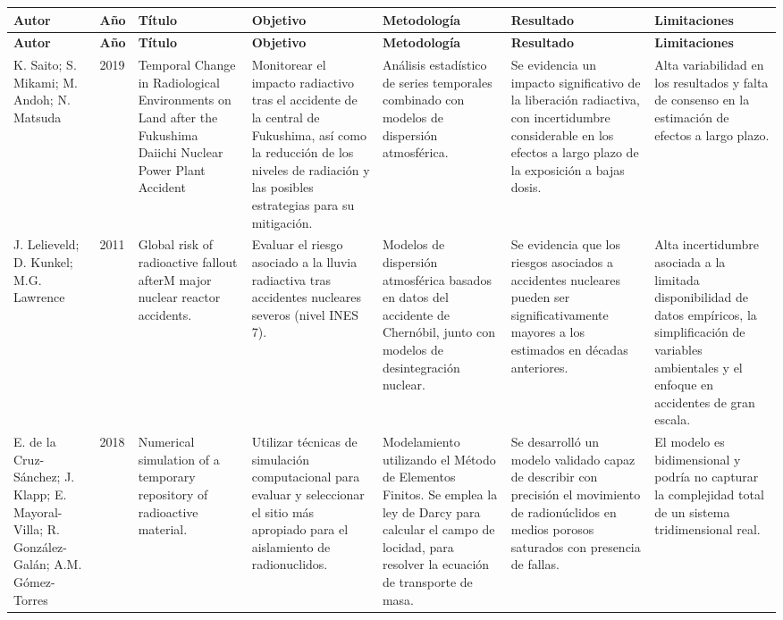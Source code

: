{\footnotesize
\renewcommand{\arraystretch}{1.2}
\begin{longtable}{|p{2.2cm}|p{0.7cm}|p{2.4cm}|p{2.8cm}|p{2.8cm}|p{2.8cm}|p{2.3cm}|}
\hline
\textbf{Autor} & \textbf{Año} & \textbf{Título} & \textbf{Objetivo} & \textbf{Metodología} & \textbf{Resultado} & \textbf{Limitaciones} \\
\hline
\endfirsthead

\hline
\textbf{Autor} & \textbf{Año} & \textbf{Título} & \textbf{Objetivo} & \textbf{Metodología} & \textbf{Resultado} & \textbf{Limitaciones} \\
\hline
\endhead

K. Saito; S. Mikami; M. Andoh; N. Matsuda
& 2019
& Temporal Change in Radiological Environments on Land after the Fukushima Daiichi Nuclear Power Plant Accident
& Monitorear el impacto radiactivo tras el accidente de la central de Fukushima, así como la reducción de los niveles de radiación y las posibles estrategias para su mitigación.
& Análisis estadístico de series temporales combinado con modelos de dispersión atmosférica.
& Se evidencia un impacto significativo de la liberación radiactiva, con incertidumbre considerable en los efectos a largo plazo de la exposición a bajas dosis.
& Alta variabilidad en los resultados y falta de consenso en la estimación de efectos a largo plazo. \\
\hline


J. Lelieveld; D. Kunkel; M.G. Lawrence 
& 2011 
& Global risk of radioactive fallout afterM major nuclear reactor accidents.
& Evaluar el riesgo asociado a la lluvia radiactiva tras accidentes nucleares severos (nivel INES 7).
& Modelos de dispersión atmosférica basados en datos del accidente de Chernóbil, junto con modelos de desintegración nuclear.
& Se evidencia que los riesgos asociados a accidentes nucleares pueden ser significativamente mayores a los estimados en décadas anteriores.
& Alta incertidumbre asociada a la limitada disponibilidad de datos empíricos, la simplificación de variables ambientales y el enfoque en accidentes de gran escala. \\
\hline

E. de la Cruz-Sánchez; J. Klapp; E. Mayoral-Villa; R. González-Galán; A.M. Gómez-Torres
& 2018
& Numerical simulation of a temporary repository of radioactive material.
& Utilizar técnicas de simulación computacional para evaluar y seleccionar el sitio más apropiado para el aislamiento de radionuclidos.
& Modelamiento utilizando el Método de Elementos Finitos. Se emplea la ley de Darcy para calcular el campo de locidad, para resolver la ecuación de transporte de masa.
& Se desarrolló un modelo validado capaz de describir con precisión el movimiento de radionúclidos en medios porosos saturados con presencia de fallas.
& El modelo es bidimensional y podría no capturar la complejidad total de un sistema tridimensional real. \\
\hline


\end{longtable}}
